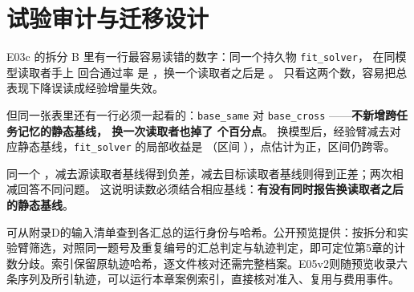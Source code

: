 \chapter{试验审计与迁移设计}
\label{ch15}


\begin{failurebox}
E03c 的拆分 B 里有一行最容易读错的数字：同一个持久物 \texttt{fit\_solver}，
在同模型读取者手上 回合通过率 是 ，换一个读取者之后是 。
只看这两个数，容易把总表现下降误读成经验增量失效。

但同一张表里还有一行必须一起看的：\texttt{base\_same}  对
\texttt{base\_cross} ——\textbf{不新增跨任务记忆的静态基线，
换一次读取者也掉了  个百分点}。
换模型后，经验臂减去对应静态基线，\texttt{fit\_solver} 的局部收益是
（区间 \measured{$[-0.0125, +0.2125]$}），点估计为正，区间仍跨零。

同一个 ，减去源读取者基线得到负差，减去目标读取者基线则得到正差；两次相减回答不同问题。
这说明读数必须结合相应基线：\textbf{有没有同时报告换读取者之后的静态基线}。
\end{failurebox}


可从附录D的输入清单查到各汇总的运行身份与哈希。公开预览提供：按拆分和实验臂筛选，对照同一题号及重复编号的汇总判定与轨迹判定，即可定位第5章的计数分歧。索引保留原轨迹哈希，逐文件核对还需完整档案。E05v2则随预览收录六条序列及所引轨迹，可以运行本章案例索引，直接核对准入、复用与费用事件。

